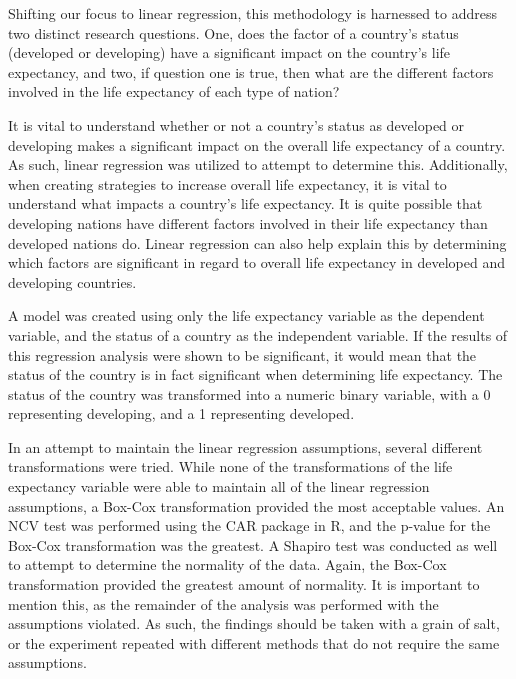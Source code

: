 \documentclass[12pt]{article}
\begin{document}
\begin{multicols}{2}
Shifting our focus to linear regression, this methodology is harnessed to address two distinct research questions.  One, does the factor of a country's status (developed or developing) have a significant impact on the country's life expectancy, and two, if question one is true, then what are the different factors involved in the life expectancy of each type of nation? 

It is vital to understand whether or not a country's status as developed or developing makes a significant impact on the overall life expectancy of a country. As such, linear regression was utilized to attempt to determine this. Additionally, when creating strategies to increase overall life expectancy, it is vital to understand what impacts a country's life expectancy. It is quite possible that developing nations have different factors involved in their life expectancy than developed nations do. Linear regression can also help explain this by determining which factors are significant in regard to overall life expectancy in developed and developing countries. 

A model was created using only the life expectancy variable as the dependent variable, and the status of a country as the independent variable. If the results of this regression analysis were shown to be significant, it would mean that the status of the country is in fact significant when determining life expectancy. The status of the country was transformed into a numeric binary variable, with a 0 representing developing, and a 1 representing developed.  

In an attempt to maintain the linear regression assumptions, several different transformations were tried. While none of the transformations of the life expectancy variable were able to maintain all of the linear regression assumptions, a Box-Cox transformation provided the most acceptable values. An NCV test was performed using the CAR package in R, and the p-value for the Box-Cox transformation was the greatest. A Shapiro test was conducted as well to attempt to determine the normality of the data. Again, the Box-Cox transformation provided the greatest amount of normality. It is important to mention this, as the remainder of the analysis was performed with the assumptions violated. As such, the findings should be taken with a grain of salt, or the experiment repeated with different methods that do not require the same assumptions. 


\end{multicols}
\end{document}
